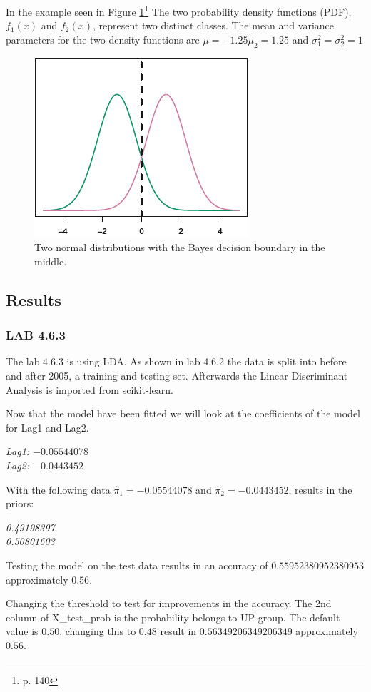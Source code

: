 In the example seen in Figure \ref{fig:TwoOneDimensionalNormalDensityFunctions}\footnote{\cite{James2013} p. 140} The two probability density functions (PDF), $f_1(x)$ and $f_2(x)$, represent two distinct classes. The mean and variance parameters for the two density functions are $\mu=-1.25 \mu_2=1.25$ and $\sigma^2_1=\sigma^2_2=1$
\begin{figure}[H]
	\centering
	\includegraphics[scale=2.0]{discriminantAnalysis/linearDiscriminantAnalysis/fig/TwoOneDimensionalNormalDensityFunctions.jpg}
	\caption{Two normal distributions with the Bayes decision boundary in the middle.}
	\label{fig:TwoOneDimensionalNormalDensityFunctions}
\end{figure}


\subsection{Results}
\subsubsection*{LAB 4.6.3}
The lab 4.6.3 is using LDA. As shown in lab 4.6.2 the data is split into before and after 2005, a training and testing set. Afterwards the Linear Discriminant Analysis is imported from scikit-learn.

Now that the model have been fitted we will look at the coefficients of the model for Lag1 and Lag2.

\noindent\textit{Lag1: $-0.05544078$\\
Lag2: $-0.0443452$}

With the following data $\hat{ \pi }_1 = -0.05544078$ and $\hat{ \pi }_2 = -0.0443452 $, results in the priors:%

\noindent\textit{0.49198397\\
0.50801603}

Testing the model on the test data results in an accuracy of $0.55952380952380953$ approximately $0.56$.

Changing the threshold to test for improvements in the accuracy. The 2nd column of X\_test\_prob is the probability belongs to UP group. The default value is $0.50$, changing this to $0.48$ result in $0.56349206349206349$ approximately $0.56$.
